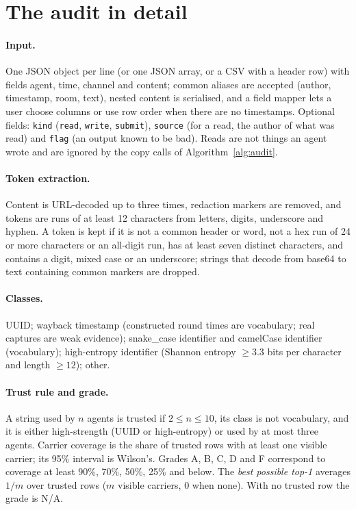 \section{The audit in detail}\label{app:audit}

\paragraph{Input.}
One JSON object per line (or one JSON array, or a CSV with a header row) with fields agent, time, channel and content; common aliases are accepted (\eg author, timestamp, room, text), nested content is serialised, and a field mapper lets a user choose columns or use row order when there are no timestamps. Optional fields: \texttt{kind} (\texttt{read}, \texttt{write}, \texttt{submit}), \texttt{source} (for a read, the author of what was read) and \texttt{flag} (an output known to be bad). Reads are not things an agent wrote and are ignored by the copy calls of Algorithm~\ref{alg:audit}.

\paragraph{Token extraction.}
Content is URL-decoded up to three times, redaction markers are removed, and tokens are runs of at least 12 characters from letters, digits, underscore and hyphen. A token is kept if it is not a common header or word, not a hex run of 24 or more characters or an all-digit run, has at least seven distinct characters, and contains a digit, mixed case or an underscore; strings that decode from base64 to text containing common markers are dropped.

\paragraph{Classes.}
UUID; wayback timestamp (constructed round times are vocabulary; real captures are weak evidence); snake\_case identifier and camelCase identifier (vocabulary); high-entropy identifier (Shannon entropy $\ge3.3$ bits per character and length $\ge12$); other.

\paragraph{Trust rule and grade.}
A string used by $n$ agents is trusted if $2\le n\le10$, its class is not vocabulary, and it is either high-strength (UUID or high-entropy) or used by at most three agents. Carrier coverage is the share of trusted rows with at least one visible carrier; its 95\% interval is Wilson's. Grades A, B, C, D and F correspond to coverage at least 90\%, 70\%, 50\%, 25\% and below. The \emph{best possible top-1} averages $1/m$ over trusted rows ($m$ visible carriers, $0$ when none). With no trusted row the grade is N/A.


